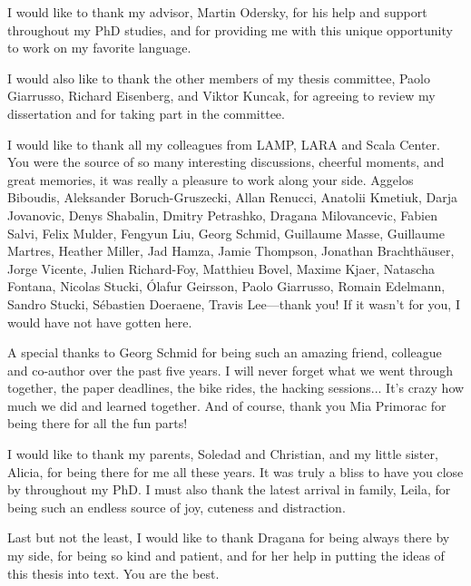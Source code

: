 I would like to thank my advisor, Martin Odersky, for his help and support throughout my PhD studies, and for providing me with this unique opportunity to work on my favorite language.

I would also like to thank the other members of my thesis committee, Paolo Giarrusso, Richard Eisenberg, and Viktor Kuncak, for agreeing to review my dissertation and for taking part in the committee.

I would like to thank all my colleagues from LAMP, LARA and Scala Center.
You were the source of so many interesting discussions, cheerful moments, and great memories, it was really a pleasure to work along your side.
Aggelos Biboudis,
Aleksander Boruch-Gruszecki,
Allan Renucci,
Anatolii Kmetiuk,
Darja Jovanovic,
Denys Shabalin,
Dmitry Petrashko,
Dragana Milovancevic,
Fabien Salvi,
Felix Mulder,
Fengyun Liu,
Georg Schmid,
Guillaume Masse,
Guillaume Martres,
Heather Miller,
Jad Hamza,
Jamie Thompson,
Jonathan Brachthäuser,
Jorge Vicente,
Julien Richard-Foy,
Matthieu Bovel,
Maxime Kjaer,
Natascha Fontana,
Nicolas Stucki,
Ólafur Geirsson,
Paolo Giarrusso,
Romain Edelmann,
Sandro Stucki,
Sébastien Doeraene,
Travis Lee---thank you!
If it wasn't for you, I would have not have gotten here.

A special thanks to Georg Schmid for being such an amazing friend, colleague and co-author over the past five years.
I will never forget what we went through together, the paper deadlines, the bike rides, the hacking sessions...
It's crazy how much we did and learned together.
And of course, thank you Mia Primorac for being there for all the fun parts!

I would like to thank my parents, Soledad and Christian, and my little sister, Alicia, for being there for me all these years.
It was truly a bliss to have you close by throughout my PhD.
I must also thank the latest arrival in family, Leila, for being such an endless source of joy, cuteness and distraction.

Last but not the least, I would like to thank Dragana for being always there by my side, for being so kind and patient, and for her help in putting the ideas of this thesis into text.
You are the best.
